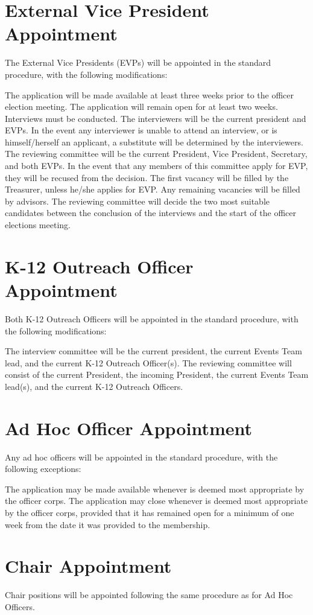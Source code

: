 \section{External Vice President Appointment} The External Vice Presidents (EVPs) will be appointed in the standard procedure, with the following modifications:
\begin{enumsubsection}
\itemnotoc The application will be made available at least three weeks prior to the officer election meeting.
\itemnotoc The application will remain open for at least two weeks.
\itemnotoc Interviews must be conducted. The interviewers will be the current president and EVPs. In the event any interviewer is unable to attend an interview, or is himself/herself an applicant, a substitute will be determined by the interviewers. 
\itemnotoc The reviewing committee will be the current President, Vice President, Secretary, and both EVPs. In the event that any members of this committee apply for EVP, they will be recused from the decision. The first vacancy will be filled by the Treasurer, unless he/she applies for EVP. Any remaining vacancies will be filled by advisors. 
\itemnotoc The reviewing committee will decide the two most suitable candidates between the conclusion of the interviews and the start of the officer elections meeting.
\end{enumsubsection}
\section{K-12 Outreach Officer Appointment} Both K-12 Outreach Officers will be appointed in the standard procedure, with the following modifications:
\begin{enumsubsection}
\itemnotoc The interview committee will be the current president, the current Events Team lead, and the current K-12 Outreach Officer(s).
\itemnotoc The reviewing committee will consist of the current President, the incoming President, the current Events Team lead(s), and the current K-12 Outreach Officers.
\end{enumsubsection}
\section{Ad Hoc Officer Appointment} Any ad hoc officers will be appointed in the standard procedure, with the following exceptions:
\begin{enumsubsection}
\itemnotoc The application may be made available whenever is deemed most appropriate by the officer corps.
\itemnotoc The application may close whenever is deemed most appropriate by the officer corps, provided that it has remained open for a minimum of one week from the date it was provided to the membership.
\end{enumsubsection}
\section{Chair Appointment} Chair positions will be appointed following the same procedure as for Ad Hoc Officers.